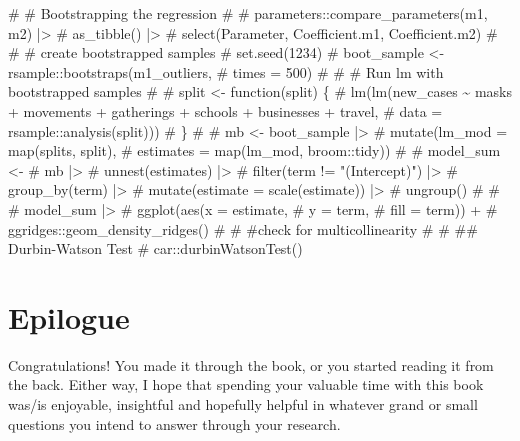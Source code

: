 \documentclass[
  letterpaper,
]{krantz}
\makeatletter
\newenvironment{Shaded}{\begin{snugshade}}{\end{snugshade}}
\newcommand{\CommentTok}[1]{\textcolor[rgb]{0.37,0.37,0.37}{#1}}
\newenvironment{kframe}{%
\medskip{}
\setlength{\fboxsep}{.8em}
 \def\at@end@of@kframe{}%
 \ifinner\ifhmode%
  \def\at@end@of@kframe{\end{minipage}}%
  \begin{minipage}{\columnwidth}%
 \fi\fi%
 \def\FrameCommand##1{\hskip\@totalleftmargin \hskip-\fboxsep
 \colorbox{shadecolor}{##1}\hskip-\fboxsep
     \hskip-\linewidth \hskip-\@totalleftmargin \hskip\columnwidth}%
 \MakeFramed {\advance\hsize-\width
   \@totalleftmargin\z@ \linewidth\hsize
   \@setminipage}}%
 {\par\unskip\endMakeFramed%
 \at@end@of@kframe}
\renewenvironment{Shaded}{\begin{kframe}}{\end{kframe}}
\makeatother
\begin{document}
\begin{Shaded}
\begin{Highlighting}[]
\CommentTok{\# \# Bootstrapping the regression}
\CommentTok{\#}
\CommentTok{\# parameters::compare\_parameters(m1, m2) |\textgreater{}}
\CommentTok{\#   as\_tibble() |\textgreater{}}
\CommentTok{\#   select(Parameter, Coefficient.m1, Coefficient.m2)}
\CommentTok{\#}
\CommentTok{\# \# create bootstrapped samples}
\CommentTok{\# set.seed(1234)}
\CommentTok{\# boot\_sample \textless{}{-} rsample::bootstraps(m1\_outliers,}
\CommentTok{\#                                            times = 500)}
\CommentTok{\#}
\CommentTok{\# \# Run lm with bootstrapped samples}
\CommentTok{\#}
\CommentTok{\# split \textless{}{-} function(split) \{}
\CommentTok{\#   lm(lm(new\_cases \textasciitilde{} masks + movements + gatherings + schools + businesses + travel,}
\CommentTok{\#         data = rsample::analysis(split)))}
\CommentTok{\# \}}
\CommentTok{\#}
\CommentTok{\# mb \textless{}{-} boot\_sample |\textgreater{}}
\CommentTok{\#   mutate(lm\_mod = map(splits, split),}
\CommentTok{\#          estimates = map(lm\_mod, broom::tidy))}
\CommentTok{\#}
\CommentTok{\# model\_sum \textless{}{-}}
\CommentTok{\#   mb |\textgreater{}}
\CommentTok{\#   unnest(estimates) |\textgreater{}}
\CommentTok{\#   filter(term != "(Intercept)") |\textgreater{}}
\CommentTok{\#   group\_by(term) |\textgreater{}}
\CommentTok{\#   mutate(estimate = scale(estimate)) |\textgreater{}}
\CommentTok{\#   ungroup()}
\CommentTok{\#}
\CommentTok{\#}
\CommentTok{\# model\_sum |\textgreater{}}
\CommentTok{\#   ggplot(aes(x = estimate,}
\CommentTok{\#              y = term,}
\CommentTok{\#              fill = term)) +}
\CommentTok{\#   ggridges::geom\_density\_ridges()}
\CommentTok{\#}
\CommentTok{\# \#check for multicollinearity}
\CommentTok{\#}
\CommentTok{\# \#\# Durbin{-}Watson Test}
\CommentTok{\# car::durbinWatsonTest()}
\end{Highlighting}
\end{Shaded}


\chapter*{Epilogue}\label{sec-epilogue}


Congratulations! You made it through the book, or you started reading it
from the back. Either way, I hope that spending your valuable time with
this book was/is enjoyable, insightful and hopefully helpful in whatever
grand or small questions you intend to answer through your research.
\end{document}

